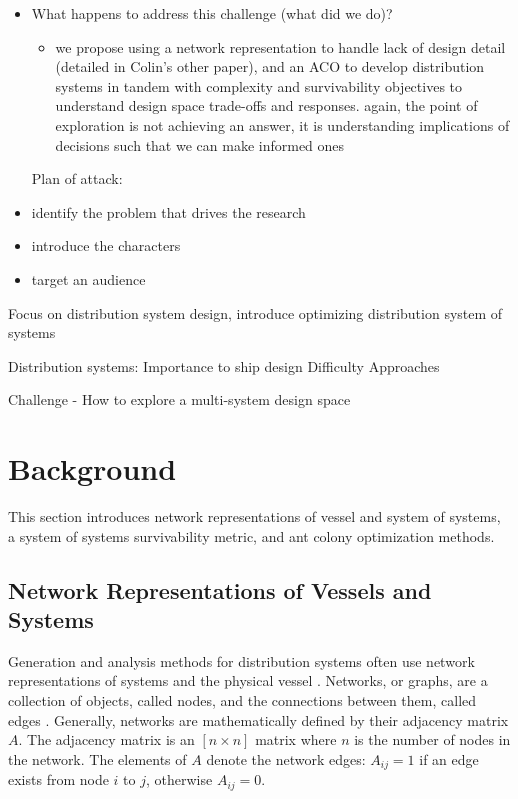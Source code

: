 \documentclass[preprint,12pt]{elsarticle}
\begin{document}
\begin{itemize}
\begin{itemize}
		\item 
	\end{itemize}
	\item What happens to address this challenge (what did we do)?
	\begin{itemize}
		\item we propose using a network representation to handle lack of design detail (detailed in Colin's other paper), and an ACO to develop distribution systems in tandem with complexity and survivability objectives to understand design space trade-offs and responses. again, the point of exploration is not achieving an answer, it is understanding implications of decisions such that we can make informed ones
	\end{itemize}
\end{itemize}
\begin{itemize}
	\item[Plan of attack:]
	\item identify the problem that drives the research
	\item introduce the characters
	\item target an audience
\end{itemize}

Focus on distribution system design, introduce optimizing distribution system of systems

Distribution systems:
Importance to ship design
Difficulty
Approaches

Challenge - How to explore a multi-system design space

\section{Background}
This section introduces network representations of vessel and system of systems, a system of systems survivability metric, and ant colony optimization methods.

\subsection{Network Representations of Vessels and Systems} 
Generation and analysis methods for distribution systems often use network representations of systems and the physical vessel \cite{Gillespie2013,Rigterink2014,Dellsy2015,Trapp2015}. Networks, or graphs, are a collection of objects, called nodes, and the connections between them, called edges \cite{Newman2003}. Generally, networks are mathematically defined by their adjacency matrix $A$. The adjacency matrix is an $[n\times n]$ matrix where $n$ is the number of nodes in the network. The elements of $A$ denote the network edges: $A_{ij}=1$ if an edge exists from node $i$ to $j$, otherwise $A_{ij}=0$.
\end{document}
